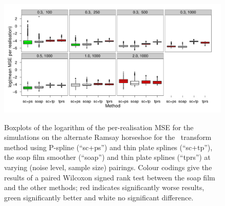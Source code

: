 
\begin{figure}
\centering
\includegraphics{sc/tablecode/altramsay-boxplot.pdf} \\
\caption{Boxplots of the logarithm of the per-realisation MSE for the simulations on the alternate Ramsay horseshoe for the \sch\ transform method using P-spline (``sc+ps'') and thin plate splines (``sc+tp''), the soap film smoother (``soap'') and thin plate splines (``tprs'') at varying (noise level, sample size) pairings. Colour codings give the results of a paired Wilcoxon signed rank test between the soap film and the other methods; red indicates significantly worse results, green significantly better and white no significant difference.}
\label{sc-altram-boxplot}
\end{figure}


